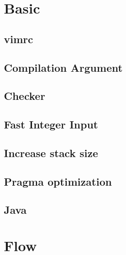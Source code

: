 \documentclass[a4paper,10pt,twocolumn,oneside]{article}
\begin{document}
\pagestyle{fancy}
\fancyfoot{}
\fancyhead[R]{\thepage}
\renewcommand{\headrulewidth}{0.4pt}
\renewcommand{\contentsname}{Contents} 

\scriptsize
\tableofcontents
\newpage
%
\section{Basic}
\subsection{vimrc}

\subsection{Compilation Argument}

\subsection{Checker}

\subsection{Fast Integer Input}

\subsection{Increase stack size}

\subsection{Pragma optimization}

\subsection{Java}

\section{Flow}
\end{document}
